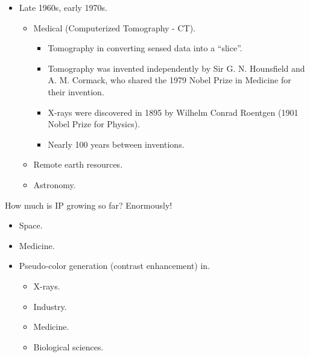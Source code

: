 
\begin{frame}
\begin{itemize}
\item Late 1960s, early 1970s.
\begin{itemize}
\item Medical (Computerized Tomography - CT).
\begin{itemize}
\item Tomography in converting sensed data into a ``slice''.
\item Tomography was invented independently by Sir G. N. Hounsfield and A. M. Cormack, who shared the 1979 Nobel Prize in Medicine for their invention.
\item X-rays were discovered in 1895 by Wilhelm Conrad Roentgen (1901 Nobel Prize for Physics).
\item Nearly 100 years between inventions.
\end{itemize}
\item Remote earth resources.
\item Astronomy.
\end{itemize}
\end{itemize}
\end{frame}


\begin{frame}
How much is IP growing so far? Enormously!
\begin{itemize}
\item Space.
\item Medicine.
\item Pseudo-color generation (contrast enhancement) in.
\begin{itemize}
\item X-rays.
\item Industry.
\item Medicine.
\item Biological sciences.
\end{itemize}
\end{itemize}
\end{frame}


